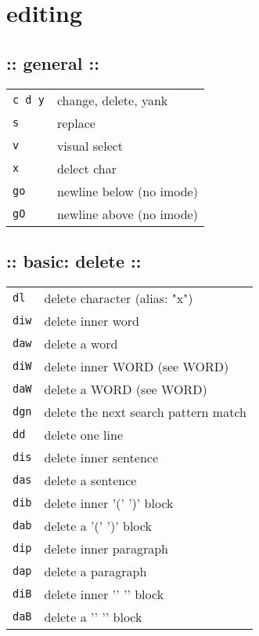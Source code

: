 \section{\hrulefill editing\hrulefill}
\subsection{:: general ::}
\begin{tabular}{@{}ll@{}}
    \verb!c d y!    & change, delete, yank \\
    \verb!s!        & replace \\
    \verb!v!        & visual select \\
    \verb!x!        & delect char \\
    \verb!go!       & newline below (no imode) \\
    \verb!gO!       & newline above (no imode) \\
\end{tabular}

\subsection{:: basic: delete ::}
\begin{tabular}{@{}ll@{}}
    \verb!dl!       & delete character (alias: "x") \\
    \verb!diw!      & delete inner word \\
    \verb!daw!      & delete a word \\
    \verb!diW!      & delete inner WORD (see WORD) \\
    \verb!daW!      & delete a WORD (see WORD) \\
    \verb!dgn!      & delete the next search pattern match \\
    \verb!dd!       & delete one line \\
    \verb!dis!      & delete inner sentence \\
    \verb!das!      & delete a sentence \\
    \verb!dib!      & delete inner '(' ')' block \\
    \verb!dab!      & delete a '(' ')' block \\
    \verb!dip!      & delete inner paragraph \\
    \verb!dap!      & delete a paragraph \\
    \verb!diB!      & delete inner '{' '}' block \\
    \verb!daB!      & delete a '{' '}' block \\
\end{tabular}

